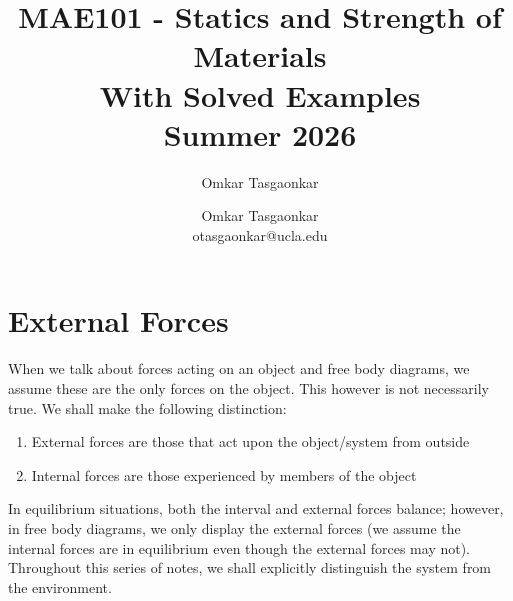 \documentclass[10pt,letterpaper]{article} %
\author{Omkar Tasgaonkar}
\title{MAE101 - Statics and Strength of Materials \\[0.5em] \large With Solved Examples \\[0.5em] \large Summer 2026}
\author{Omkar Tasgaonkar \\ \small otasgaonkar@ucla.edu}
\date{}
\begin{document}
\maketitle
\thispagestyle{firstpage}
\begin{tcolorbox}[colback=white, colframe=black, arc=0mm]
\tableofcontents
\end{tcolorbox}
\newpage

\section{External Forces}
When we talk about forces acting on an object and free body diagrams, we assume these are the only forces on the object. This however is not necessarily true. We shall make the following distinction:
\begin{enumerate}
\item External forces are those that act upon the object/system from outside
\item Internal forces are those experienced by members of the object
\end{enumerate}
In equilibrium situations, both the interval and external forces balance; however, in free body diagrams, we only display the external forces (we assume the internal forces are in equilibrium even though the external forces may not).\\

Throughout this series of notes, we shall explicitly distinguish the system from the environment.





\end{document}
